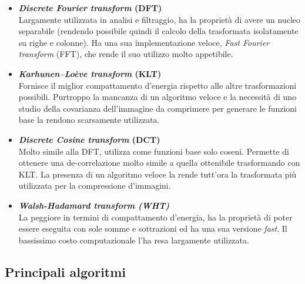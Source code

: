 \begin{itemize}
  
  \item \textbf{\emph{Discrete Fourier transform} (DFT)}\\
    Largamente utilizzata in analisi e filtraggio, ha la proprietà di avere un 
    nucleo separabile (rendendo possibile quindi il calcolo della trasformata 
    isolatamente su righe e colonne). Ha una sua implementazione veloce, 
    \emph{Fast Fourier transform} (FFT), che rende il suo utilizzo molto 
    appetibile.
    
  \item \textbf{\emph{Karhunen–Loève transform} (KLT)}\\
    Fornisce il miglior compattamento d'energia rispetto alle altre 
    trasformazioni possibili. Purtroppo la mancanza di un algoritmo veloce e la 
    necessità di uno studio della covarianza dell'immagine da comprimere per 
    generare le funzioni base la rendono scarsamente utilizzata.
    
  \item \textbf{\emph{Discrete Cosine transform} (DCT)}\\
    Molto simile alla DFT, utilizza come funzioni base solo coseni.
    Permette di ottenere una de-correlazione molto simile a quella ottenibile 
    trasformando con KLT. La presenza di un algoritmo veloce la rende tutt'ora 
    la trasformata più utilizzata per la compressione d'immagini.
   
  \item \textbf{\emph{Walsh-Hadamard transform (WHT)}}\\
    La peggiore in termini di compattamento d'energia, ha la proprietà di poter 
    essere eseguita con sole somme e sottrazioni ed ha una sua versione 
    \emph{fast}. Il bassissimo costo computazionale l'ha resa largamente 
    utilizzata.
    
\end{itemize}


\subsection{Principali algoritmi}


